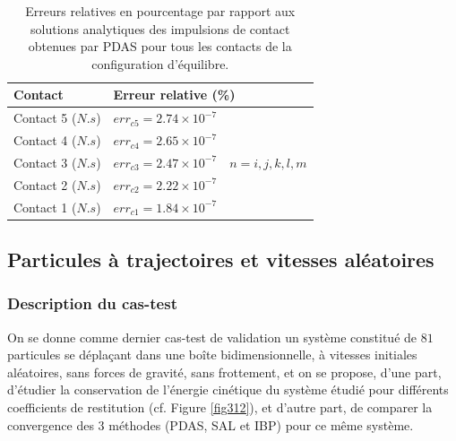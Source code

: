 \begin{center}
\begin{table}[!h]
\begin{tabular}{ |p{5.75cm}|p{6.8cm}| }
 \hline \rowcolor{lightgray}
 Contact& Erreur relative (\%)\\
 \hline
 Contact 5 ($N.s$) & $err_{c5} = 2.74\times10^{-7}$\\
 Contact 4 ($N.s$) & $err_{c4} = 2.65\times10^{-7}$\\
 Contact 3 ($N.s$) & $err_{c3} = 2.47\times10^{-7} \quad n = i,j,k,l,m$\\
 Contact 2 ($N.s$) & $err_{c2} = 2.22\times10^{-7}$\\
 Contact 1 ($N.s$) & $err_{c1} = 1.84\times10^{-7}$\\
 \hline
\end{tabular}
\caption{Erreurs relatives en pourcentage par rapport aux solutions analytiques des impulsions de contact obtenues par PDAS pour tous les contacts de la configuration d'équilibre.}
\end{table}
\end{center}

\vspace{-1.75cm}

\subsection{Particules à trajectoires et vitesses aléatoires}
\subsubsection{Description du cas-test}

On se donne comme dernier cas-test de validation un système constitué de $81$ particules se déplaçant dans une boîte bidimensionnelle, à vitesses initiales aléatoires, sans forces de gravité, sans frottement, et on se propose, d'une part, d'étudier la conservation de l'énergie cinétique du système étudié pour différents coefficients de restitution (cf. Figure \ref{fig312}), et d'autre part, de comparer la convergence des 3 méthodes (PDAS, SAL et IBP) pour ce même système.

